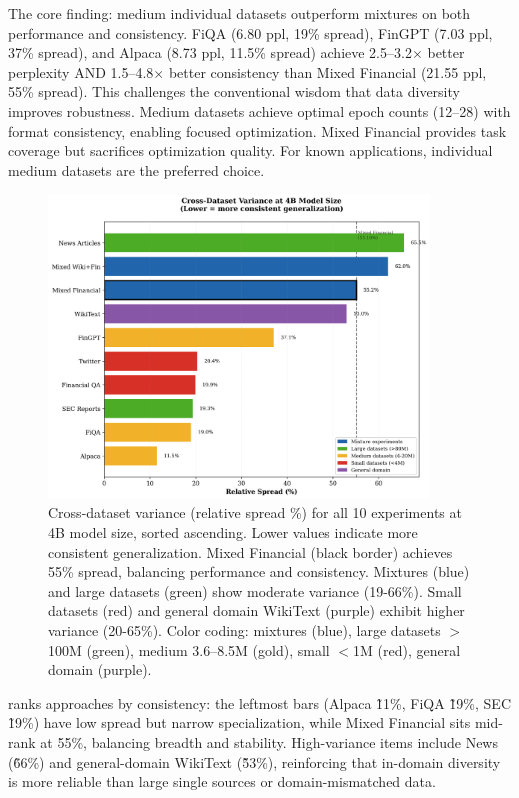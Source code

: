 The core finding: medium individual datasets outperform mixtures on both performance and consistency. FiQA (6.80 ppl, 19\% spread), FinGPT (7.03 ppl, 37\% spread), and Alpaca (8.73 ppl, 11.5\% spread) achieve 2.5–3.2$\times$ better perplexity AND 1.5–4.8$\times$ better consistency than Mixed Financial (21.55 ppl, 55\% spread). This challenges the conventional wisdom that data diversity improves robustness. Medium datasets achieve optimal epoch counts (12–28) with format consistency, enabling focused optimization. Mixed Financial provides task coverage but sacrifices optimization quality. For known applications, individual medium datasets are the preferred choice.

\begin{figure}[htbp]
\centering
\includegraphics[width=0.9\textwidth]{figures/bar_variance.png}
\caption[Cross-Dataset Variance Comparison]{Cross-dataset variance (relative spread \%) for all 10 experiments at 4B model size, sorted ascending. Lower values indicate more consistent generalization. Mixed Financial (black border) achieves 55\% spread, balancing performance and consistency. Mixtures (blue) and large datasets (green) show moderate variance (19-66\%). Small datasets (red) and general domain WikiText (purple) exhibit higher variance (20-65\%). Color coding: mixtures (blue), large datasets $>$100M (green), medium 3.6–8.5M (gold), small $<$1M (red), general domain (purple).}
\label{fig:bar_variance}
\end{figure}

 ranks approaches by consistency: the leftmost bars (Alpaca \~11\%, FiQA \~19\%, SEC \~19\%) have low spread but narrow specialization, while Mixed Financial sits mid-rank at 55\%, balancing breadth and stability. High-variance items include News (\~66\%) and general-domain WikiText (\~53\%), reinforcing that in-domain diversity is more reliable than large single sources or domain-mismatched data.

